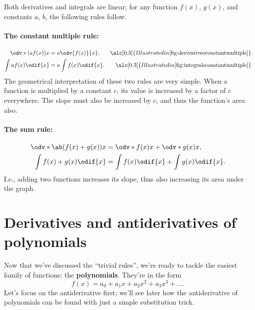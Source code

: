 Both derivatives and integrals are linear; for any function $f(x)$, $g(x)$, and constants $a$, $b$, the following rules follow.
\paragraph{The constant multiple rule:}
\begin{align}
	\odv*{(af(x))}{x}  & = a\odv{f(x)}{x},     & \alc[0.3]{Illustrated in \cref{fig:derivativesconstantmultiple}}\label{eq:derivativesconstantmultiple} \\
	\int af(x)\odif{x} & = a\int f(x)\odif{x}. & \alc[0.3]{Illustrated in \cref{fig:integralsconstantmultiple}}\label{eq:integralsconstantmultiple}
\end{align}
The geometrical interpretation of these two rules are very simple. When a function is multiplied by a constant $c$, its value is increased by a factor of $c$ everywhere. The slope must also be increased by $c$, and thus the function's area also.
\paragraph{The sum rule:}
\begin{align}
	\odv*{\ab(f(x) + g(x))}{x} & = \odv*{f(x)}{x} + \odv*{g(x)}{x}, \label{eq:derivativesumrule}      \\
	\int f(x) + g(x)\odif{x}   & = \int f(x)\odif{x} + \int g(x)\odif{x}. \label{eq:integralssumrule}
\end{align}
I.e., adding two functions increases its slope, thus also increasing its area under the graph.

\section{Derivatives and antiderivatives of polynomials}

Now that we've discussed the \enquote{trivial rules}, we're ready to tackle the easiest family of functions: the \textbf{polynomials}. They're in the form
\begin{equation}
	f(x) = a_0 + a_1x + a_2x^2 + a_3x^3 + \dots. \label{eq:polynomial_form}
\end{equation}
Let's focus on the antiderivative first; we'll see later how the antiderivative of polynomials can be found with just a simple substitution trick.

